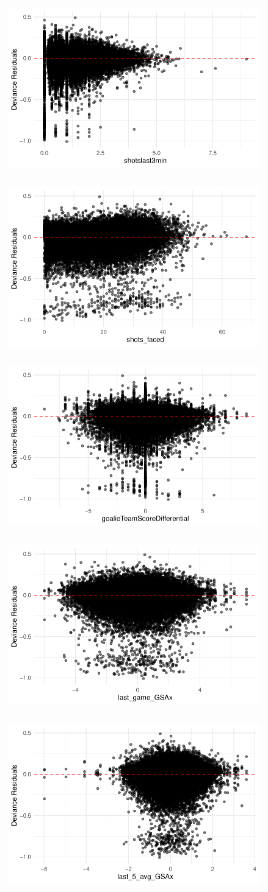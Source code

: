\documentclass[
  letterpaper,
  DIV=11,
  numbers=noendperiod]{scrartcl}
\begin{document}
\includegraphics[width=0.5\textwidth,height=\textheight]{paper_files/figure-pdf/unnamed-chunk-32-1.pdf}

\includegraphics[width=0.5\textwidth,height=\textheight]{paper_files/figure-pdf/unnamed-chunk-33-1.pdf}

\includegraphics[width=0.5\textwidth,height=\textheight]{paper_files/figure-pdf/unnamed-chunk-34-1.pdf}

\includegraphics[width=0.5\textwidth,height=\textheight]{paper_files/figure-pdf/unnamed-chunk-35-1.pdf}

\includegraphics[width=0.5\textwidth,height=\textheight]{paper_files/figure-pdf/unnamed-chunk-36-1.pdf}
\end{document}
